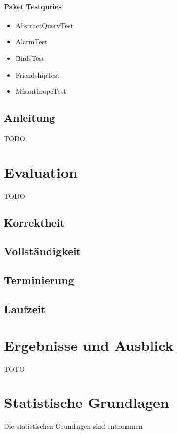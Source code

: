 \documentclass[a4paper, 11pt]{book}
\begin{document}
{\subsubsection{Paket Testquries}
\begin{itemize}
	\item AbstractQueryTest
	\item AlarmTest
	\item BirdsTest
	\item FriendshipTest
	\item MisanthropeTest
	
\end{itemize}


\section{Anleitung}
TODO







\chapter{Evaluation}\label{eval} TODO
\section{Korrektheit}
\section{Vollständigkeit}
\section{Terminierung}
\section{Laufzeit}


\chapter{Ergebnisse und Ausblick}\label{Erg}TOTO





\appendix{}

\chapter{Statistische Grundlagen}
Die statistischen Grundlagen sind \cite{BKI08} entnommen
}
\end{document}

